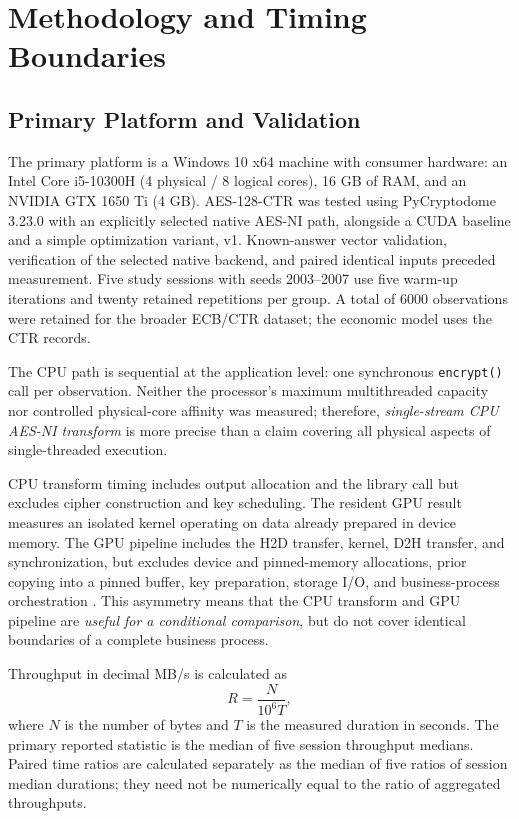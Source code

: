 \documentclass[11pt,b5paper]{article}
\begin{document}
\section{Methodology and Timing Boundaries}
\subsection{Primary Platform and Validation}
The primary platform is a Windows 10 x64 machine with consumer hardware: an Intel Core i5-10300H (4 physical / 8 logical cores), 16 GB of RAM, and an NVIDIA GTX 1650 Ti (4 GB). AES-128-CTR was tested using PyCryptodome 3.23.0 with an explicitly selected native AES-NI path, alongside a CUDA baseline and a simple optimization variant, v1. Known-answer vector validation, verification of the selected native backend, and paired identical inputs preceded measurement. Five study sessions with seeds 2003--2007 use five warm-up iterations and twenty retained repetitions per group. A total of 6000 observations were retained for the broader ECB/CTR dataset; the economic model uses the CTR records.\par
The CPU path is sequential at the application level: one synchronous \texttt{encrypt()} call per observation. Neither the processor's maximum multithreaded capacity nor controlled physical-core affinity was measured; therefore, \emph{single-stream CPU AES-NI transform} is more precise than a claim covering all physical aspects of single-threaded execution.\par
CPU transform timing includes output allocation and the library call but excludes cipher construction and key scheduling. The resident GPU result measures an isolated kernel operating on data already prepared in device memory. The GPU pipeline includes the H2D transfer, kernel, D2H transfer, and synchronization, but excludes device and pinned-memory allocations, prior copying into a pinned buffer, key preparation, storage I/O, and business-process orchestration \citep{nvidia_guide}. This asymmetry means that the CPU transform and GPU pipeline are \emph{useful for a conditional comparison}, but do not cover identical boundaries of a complete business process.\par
Throughput in decimal MB/s is calculated as
\begin{equation}\label{eq:rate}R=\frac{N}{10^6T},\end{equation}
where $N$ is the number of bytes and $T$ is the measured duration in seconds. The primary reported statistic is the median of five session throughput medians. Paired time ratios are calculated separately as the median of five ratios of session median durations; they need not be numerically equal to the ratio of aggregated throughputs.
\end{document}
